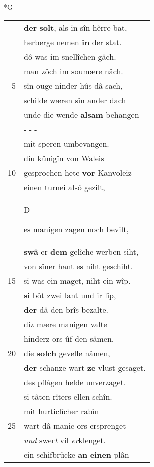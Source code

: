 \documentclass[8pt,a4paper,notitlepage]{article}
\begin{document}
\newpage
\begin{table}[ht]
\begin{minipage}[t]{0.5\linewidth}
\small
\begin{center}*G
\end{center}
\begin{tabular}{rl}
 & \textbf{der} \textbf{solt}, als in sîn hêrre bat,\\ 
 & herberge nemen \textbf{in} der stat.\\ 
 & dô was im snellîchen gâch.\\ 
 & man zôch im soumære nâch.\\ 
5 & sîn ouge ninder hûs dâ sach,\\ 
 & schilde wæren sîn ander dach\\ 
 & unde die wende \textbf{alsam} behangen\\ 
 & \multicolumn{1}{l}{ - - - }\\ 
 & mit speren umbevangen.\\ 
 & diu künigîn von Waleis\\ 
10 & gesprochen hete \textbf{vor} Kanvoleiz\\ 
 & einen turnei alsô gezilt,\\ 
 & \begin{large}D\end{large}es manigen zagen noch bevilt,\\ 
 & \textbf{swâ} er \textbf{dem} gelîche werben siht,\\ 
 & von sîner hant es niht geschiht.\\ 
15 & si was ein maget, niht ein wîp.\\ 
 & \textbf{si} bôt zwei lant und ir lîp,\\ 
 & \textbf{der} dâ den brîs bezalte.\\ 
 & diz mære manigen valte\\ 
 & hinderz ors ûf den sâmen.\\ 
20 & die \textbf{solch} gevelle nâmen,\\ 
 & \textbf{der} schanze wart \textbf{ze} vlust gesaget.\\ 
 & des pflâgen helde unverzaget.\\ 
 & si tâten rîters ellen schîn.\\ 
 & mit hurticlîcher rabîn\\ 
25 & wart dâ manic ors ersprenget\\ 
 & \textit{und} swer\textit{t} vil \textit{er}klenget.\\ 
 & ein schifbrücke \textbf{an} \textbf{einen} plân\\ 

\end{tabular}
\end{minipage}
\end{table}
\end{document}
